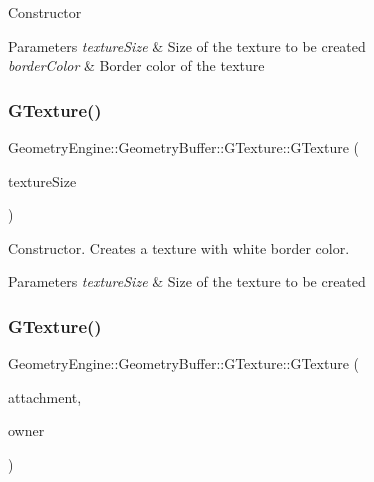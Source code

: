 Constructor 
\begin{DoxyParams}{Parameters}
{\em texture\+Size} & Size of the texture to be created \\
\hline
{\em border\+Color} & Border color of the texture \\
\hline
\end{DoxyParams}
\mbox{\label{class_geometry_engine_1_1_geometry_buffer_1_1_g_texture_a8fa5f02d38154ba8642512e871a8edeb}} 
\subsubsection{\texorpdfstring{GTexture()}{GTexture()}\hspace{0.1cm}{\footnotesize\ttfamily [3/6]}}
{\footnotesize\ttfamily Geometry\+Engine\+::\+Geometry\+Buffer\+::\+G\+Texture\+::\+G\+Texture (\begin{DoxyParamCaption}\item[{const Q\+Vector2D \&}]{texture\+Size }\end{DoxyParamCaption})}

Constructor. Creates a texture with white border color. 
\begin{DoxyParams}{Parameters}
{\em texture\+Size} & Size of the texture to be created \\
\hline
\end{DoxyParams}
\mbox{\label{class_geometry_engine_1_1_geometry_buffer_1_1_g_texture_add6fc3854f8fe8996fcd29de07d05646}} 
\subsubsection{\texorpdfstring{GTexture()}{GTexture()}\hspace{0.1cm}{\footnotesize\ttfamily [4/6]}}
{\footnotesize\ttfamily Geometry\+Engine\+::\+Geometry\+Buffer\+::\+G\+Texture\+::\+G\+Texture (\begin{DoxyParamCaption}\item[{G\+Framebuffer\+Commons\+::\+G\+\_\+\+C\+O\+L\+O\+R\+\_\+\+A\+T\+T\+A\+C\+H\+M\+E\+N\+TS}]{attachment,  }\item[{const \mbox{\hyperlink{class_geometry_engine_1_1_geometry_buffer_1_1_g_framebuffer_object}{G\+Framebuffer\+Object}} $\ast$}]{owner }\end{DoxyParamCaption})}

